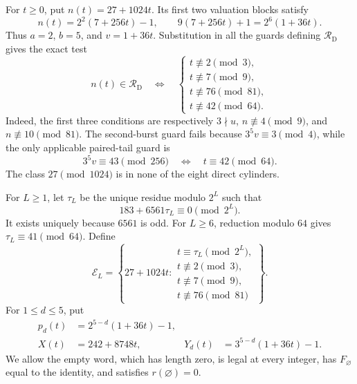 \documentclass[11pt,letterpaper]{article}
\begin{document}
For \(t\ge0\), put \(n(t)=27+1024t\). Its first two valuation blocks satisfy
\[
n(t)=2^2(7+256t)-1,
\qquad
9(7+256t)+1=2^6(1+36t).
\]
Thus \(a=2\), \(b=5\), and \(v=1+36t\). Substitution in all the
guards defining \(\mathcal R_{\mathrm D}\) gives the exact test
\begin{equation}\label{eq:TwentySevenResidual}
n(t)\in\mathcal R_{\mathrm D}
\quad\Longleftrightarrow\quad
\begin{cases}
t\not\equiv2\pmod3,\\
t\not\equiv7\pmod9,\\
t\not\equiv76\pmod{81},\\
t\not\equiv42\pmod{64}.
\end{cases}
\end{equation}
Indeed, the first three conditions are respectively \(3\nmid u\),
\(n\not\equiv4\pmod9\), and \(n\not\equiv10\pmod{81}\). The
second-burst guard fails because \(3^5v\equiv3\pmod4\), while the only
applicable paired-tail guard is
\[
3^5v\equiv43\pmod{256}
\quad\Longleftrightarrow\quad t\equiv42\pmod{64}.
\]
The class \(27\pmod{1024}\) is in none of the eight direct cylinders.

For \(L\ge1\), let \(\tau_L\) be the unique residue modulo \(2^L\)
such that
\begin{equation}\label{eq:TauDefinition}
183+6561\tau_L\equiv0\pmod{2^L}.
\end{equation}
It exists uniquely because \(6561\) is odd. For \(L\ge6\), reduction
modulo \(64\) gives \(\tau_L\equiv41\pmod{64}\). Define
\[
\mathcal E_L=
\left\{27+1024t:
\begin{array}{l}
t\equiv\tau_L\pmod{2^L},\\
t\not\equiv2\pmod3,\\
t\not\equiv7\pmod9,\\
t\not\equiv76\pmod{81}
\end{array}
\right\}.
\]
For \(1\le d\le5\), put
\[
\begin{aligned}
p_d(t)&=2^{5-d}(1+36t)-1,\\
X(t)&=242+8748t,
&Y_d(t)&=3^{5-d}(1+36t)-1.
\end{aligned}
\]
We allow the empty word, which has length zero, is legal at every integer,
has \(F_{\varnothing}\) equal to the identity, and satisfies
\(r(\varnothing)=0\).
\end{document}
